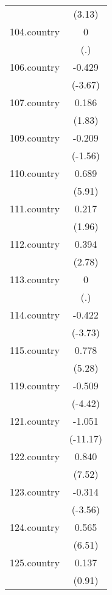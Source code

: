 {\begin{tabular}{l*{1}{c}}
            &      (3.13)         \\
[1em]
104.country &           0         \\
            &         (.)         \\
[1em]
106.country &      -0.429\sym{***}\\
            &     (-3.67)         \\
[1em]
107.country &       0.186         \\
            &      (1.83)         \\
[1em]
109.country &      -0.209         \\
            &     (-1.56)         \\
[1em]
110.country &       0.689\sym{***}\\
            &      (5.91)         \\
[1em]
111.country &       0.217\sym{*}  \\
            &      (1.96)         \\
[1em]
112.country &       0.394\sym{**} \\
            &      (2.78)         \\
[1em]
113.country &           0         \\
            &         (.)         \\
[1em]
114.country &      -0.422\sym{***}\\
            &     (-3.73)         \\
[1em]
115.country &       0.778\sym{***}\\
            &      (5.28)         \\
[1em]
119.country &      -0.509\sym{***}\\
            &     (-4.42)         \\
[1em]
121.country &      -1.051\sym{***}\\
            &    (-11.17)         \\
[1em]
122.country &       0.840\sym{***}\\
            &      (7.52)         \\
[1em]
123.country &      -0.314\sym{***}\\
            &     (-3.56)         \\
[1em]
124.country &       0.565\sym{***}\\
            &      (6.51)         \\
[1em]
125.country &       0.137         \\
            &      (0.91)         \\

\end{tabular}}
